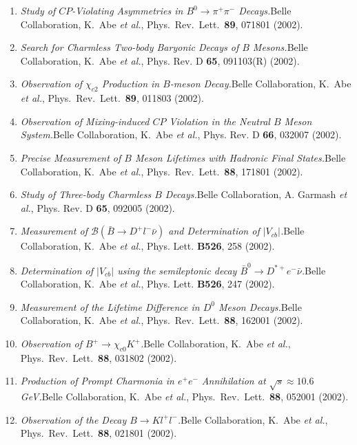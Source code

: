 \documentclass[10pt,a4paper]{article}
\def\pub#1#2#3{{\it #1.}\newline #2, #3.}
\def\PLB#1{Phys. Lett. {\bf B#1}}
\def\PRL{Phys.\ Rev.\ Lett.\ }
\def\etal{{\it et al.}}
\def\belle{Belle Collaboration, K.~Abe \etal }
\begin{document}
\begin{enumerate}
\item
\pub{Study of $CP$-Violating Asymmetries in $B^0 \to \pi^+
\pi^-$ Decays}
{\belle}
{\PRL {\bf 89}, 071801 (2002)}

\item
\pub{Search for Charmless Two-body Baryonic Decays of $B$ Mesons}
{\belle}
{Phys. Rev. D {\bf 65}, 091103(R) (2002)}

\item
\pub{Observation of $\chi_{c2}$ Production in $B$-meson Decay}
{\belle}
{\PRL {\bf 89}, 011803 (2002)}

\item
\pub{Observation of Mixing-induced $CP$ Violation in the Neutral $B$
Meson System}
{\belle}
{Phys. Rev. D {\bf 66}, 032007 (2002)}

\item
\pub{Precise Measurement of $B$ Meson Lifetimes with Hadronic Final
States}
{\belle}
{\PRL {\bf 88}, 171801 (2002)}

\item
\pub{Study of Three-body Charmless $B$ Decays}
{Belle Collaboration, A. Garmash \etal}
{Phys. Rev. D {\bf 65}, 092005 (2002)}

\item
\pub{Measurement of $\mathcal{B}( \bar{B} \to D^+ l^- \bar{\nu})$
and Determination of $|V_{cb}|$} 
{\belle}
{\PLB{526}, 258 (2002)}

\item
\pub{Determination of $|V_{cb}|$ using the semileptonic decay $\bar{B}^0
\to D^{*+}e^-\bar{\nu}$}
{\belle}
{\PLB{526}, 247 (2002)}

\item
\pub{Measurement of the Lifetime Difference in $D^0$ Meson Decays}
{\belle}
{\PRL {\bf 88}, 162001 (2002)}

\item
\pub{Observation of $B^+ \to \chi_{c0} K^+$}
{\belle}
{\PRL {\bf 88}, 031802 (2002)}

\item
\pub{Production of Prompt Charmonia in $e^+e^-$ Annihilation at
$\sqrt{s} \approx 10.6$ GeV}
{\belle}
{\PRL {\bf 88}, 052001 (2002)}

\item
\pub{Observation of the Decay $B \to K l^+ l^-$}
{\belle}
{\PRL {\bf 88}, 021801 (2002)}  %


\end{enumerate}
\end{document}
